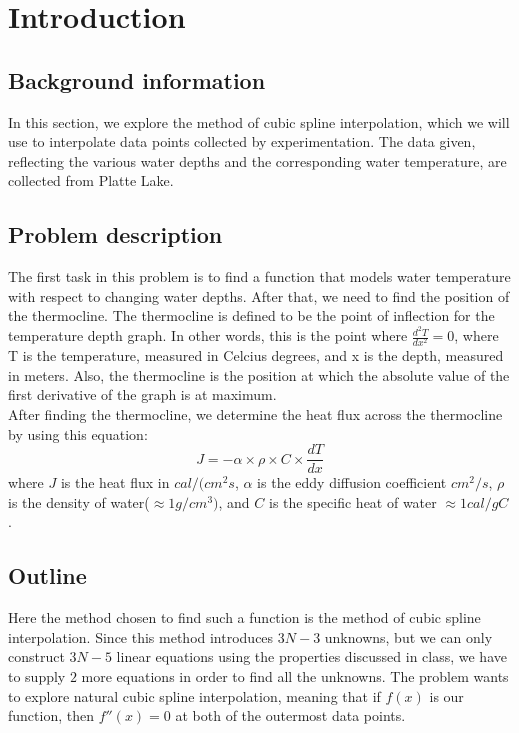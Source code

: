 \documentclass[openany]{book}
\begin{document}
	\section{Introduction}
	
	\subsection{Background information}
	In this section, we explore the method of cubic spline interpolation, which we will use to interpolate data points collected by experimentation. The data given, reflecting the various water depths and the corresponding water temperature, are collected from Platte Lake.
	
	\subsection{Problem description}
	The first task in this problem is to find a function that models water temperature with respect to changing water depths. After that, we need to find the position of the thermocline. The thermocline is defined to be the point of inflection for the temperature depth graph. In other words, this is the point where ${\frac{d^2T}{dx^2} = 0}$, where T is the temperature, measured in Celcius degrees, and x is the depth, measured in meters. Also, the thermocline is the position at which the absolute value of the first derivative of the graph is at maximum.\\
	After finding the thermocline, we determine the heat flux across the thermocline by using this equation:
	\[J = -\alpha \times \rho \times C \times \frac{dT}{dx}\]
	where ${J}$ is the heat flux in ${cal/(cm^2s}$, ${\alpha}$ is the eddy diffusion coefficient ${cm^2/s}$, ${\rho}$ is the density of water(${\approx 1 g/cm^3)}$, and ${C}$ is the specific heat of water ${\approx 1 cal/gC}$.
    
	\subsection{Outline}
	Here the method chosen to find such a function is the method of cubic spline interpolation. Since this method introduces ${3N - 3}$ unknowns, but we can only construct ${3N - 5}$ linear equations using the properties discussed in class, we have to supply ${2}$ more equations in order to find all the unknowns. The problem wants to explore natural cubic spline interpolation, meaning that if ${f(x)}$ is our function, then ${f''(x) = 0}$ at both of the outermost data points.
	
\end{document}
